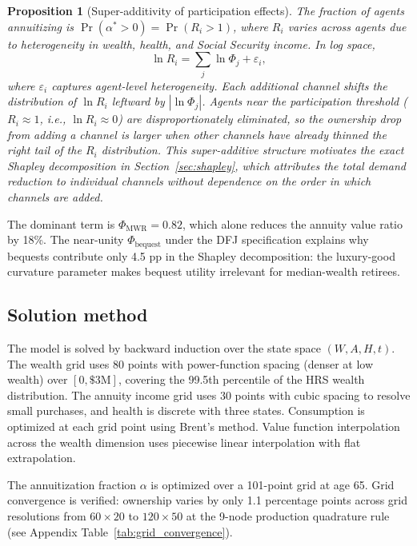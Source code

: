 \documentclass[12pt]{article}
\newtheorem{proposition}{Proposition}
\begin{document}
\begin{proposition}[Super-additivity of participation effects]
The fraction of agents annuitizing is $\Pr(\alpha^* > 0) = \Pr(R_i > 1)$, where $R_i$ varies across agents due to heterogeneity in wealth, health, and Social Security income. In log space,
\begin{equation}
\ln R_i = \sum_j \ln \Phi_j + \varepsilon_i,
\end{equation}
where $\varepsilon_i$ captures agent-level heterogeneity. Each additional channel shifts the distribution of $\ln R_i$ leftward by $|\ln \Phi_j|$. Agents near the participation threshold ($R_i \approx 1$, i.e., $\ln R_i \approx 0$) are disproportionately eliminated, so the ownership drop from adding a channel is larger when other channels have already thinned the right tail of the $R_i$ distribution. This super-additive structure motivates the exact Shapley decomposition in Section~\ref{sec:shapley}, which attributes the total demand reduction to individual channels without dependence on the order in which channels are added.
\end{proposition}

The dominant term is $\Phi_{\text{MWR}} = 0.82$, which alone reduces the annuity value ratio by 18\%. The near-unity $\Phi_{\text{bequest}}$ under the DFJ specification explains why bequests contribute only 4.5 pp in the Shapley decomposition: the luxury-good curvature parameter makes bequest utility irrelevant for median-wealth retirees.


\subsection{Solution method}

The model is solved by backward induction over the state space $(W, A, H, t)$. The wealth grid uses 80 points with power-function spacing (denser at low wealth) over $[0, \$3\text{M}]$, covering the 99.5th percentile of the HRS wealth distribution. The annuity income grid uses 30 points with cubic spacing to resolve small purchases, and health is discrete with three states. Consumption is optimized at each grid point using Brent's method. Value function interpolation across the wealth dimension uses piecewise linear interpolation with flat extrapolation.

The annuitization fraction $\alpha$ is optimized over a 101-point grid at age 65. Grid convergence is verified: ownership varies by only 1.1 percentage points across grid resolutions from $60 \times 20$ to $120 \times 50$ at the 9-node production quadrature rule (see Appendix Table~\ref{tab:grid_convergence}).
\end{document}
